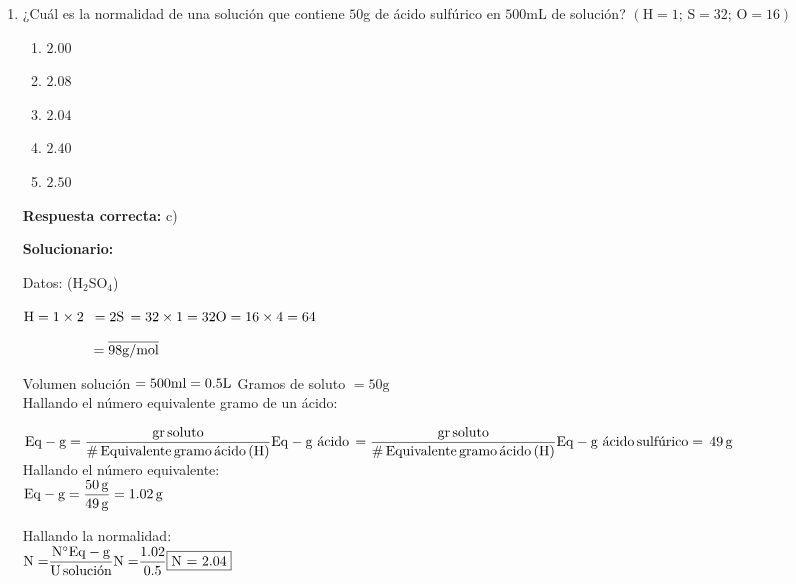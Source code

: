 \begin{enumerate}[resume]
	
	\item ¿Cuál es la normalidad de una solución que contiene $50$g de ácido sulfúrico en $500$mL de solución?
	\newline
	$(\text{H}=1;\,\text{S}=32;\,\text{O}=16)$
	
	\begin{enumerate}[label=\alph*)]
		\item $2.00$
		\item $2.08$
		\item $2.04$
		\item $2.40$
		\item $2.50$
	\end{enumerate}
	
	\textbf{Respuesta correcta:} c)
	
	\vspace{2mm}
	\textbf{Solucionario:}
	
	Datos: (H$_2$SO$_4$)
	
	$\text{H}=1\times2\,\,\,=2\\
	\text{S}\,=32\times1=32\\
	\text{O}=16\times4=64$
	
	$\,\,\,\,\,\,\,\,\,\,\,\,\,\,\,\,\,\,\,\,\,\,\,\,\,\,\,\,\,\,=\overline {{\rm{98 g/mol}}}\\$
	
	Volumen solución $=500\text{ml}=0.5\text{L}\\$
	Gramos de soluto $=50\text{g}$\\
	
	Hallando el número equivalente gramo de un ácido:
	
	${\rm{Eq}} - {\rm{g}} = \dfrac{{{\rm{gr}}\,{\rm{soluto}}}}{{{\rm{\# }}\,{\rm{Equivalente}}\,{\rm{gramo}}\,{\rm{\text{ácido}}}\,{\rm{(H)}}}}\\\\
	{\rm{Eq}} - {\rm{g}}\,\,{\rm{\text{ácido}}}\, = \dfrac{{{\rm{gr}}\,{\rm{soluto}}}}{{{\rm{\# }}\,{\rm{Equivalente}}\,{\rm{gramo}}\,{\rm{\text{ácido}}}\,{\rm{(H)}}}}\\\\
	{\rm{Eq}} - {\rm{g}}\,\,{\rm{\text{ácido}}}\,{\rm{\text{sulfúrico}}} = \,49\,{\rm{g}}$\\
	
	Hallando el número equivalente:\\
	${\rm{Eq}} - {\rm{g}} = \dfrac{{50\,{\rm{g}}}}{{49\,{\rm{g}}}} = 1.02\,{\rm{g}}$
	
	Hallando la normalidad:\\
	
	${\rm{N = }}\dfrac{{{\rm{N^\circ  Eq}} - {\rm{g}}}}{{{\rm{U}}\,{\rm{\text{solución}}}}}\\\\
	{\rm{N = }}\dfrac{{1.02}}{{{\rm{0.5}}}}\\\\
	{\rm{\fbox{N = 2.04}}}$
	
	
	
\end{enumerate}


